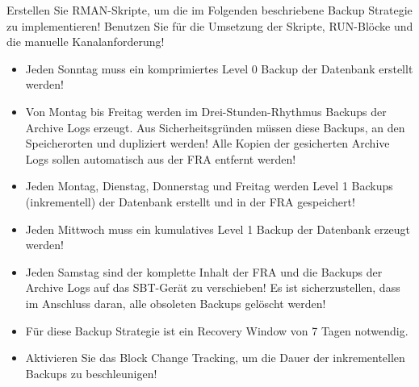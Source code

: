     \item Erstellen Sie RMAN-Skripte, um die im Folgenden beschriebene Backup Strategie zu implementieren! Benutzen Sie f\"ur die Umsetzung der Skripte, RUN-Bl\"ocke und die manuelle Kanalanforderung!
      \begin{itemize}
        \item Jeden Sonntag muss ein komprimiertes Level 0 Backup der Datenbank erstellt werden!
        \item Von Montag bis Freitag werden im Drei-Stunden-Rhythmus Backups der Archive Logs erzeugt. Aus Sicherheitsgr\"unden m\"ussen diese Backups, an den Speicherorten  und  dupliziert werden! Alle Kopien der gesicherten Archive Logs sollen automatisch aus der FRA entfernt werden!
        \item Jeden Montag, Dienstag, Donnerstag und Freitag werden Level 1 Backups (inkrementell) der Datenbank erstellt und in der FRA gespeichert!
        \item Jeden Mittwoch muss ein kumulatives Level 1 Backup der Datenbank erzeugt werden!
        \item Jeden Samstag sind der komplette Inhalt der FRA und die Backups der Archive Logs auf das SBT-Ger\"at zu verschieben! Es ist sicherzustellen, dass im Anschluss daran, alle obsoleten Backups gel\"oscht werden!
        \item F\"ur diese Backup Strategie ist ein Recovery Window von 7 Tagen notwendig.
        \item Aktivieren Sie das Block Change Tracking, um die Dauer der inkrementellen Backups zu beschleunigen!
      \end{itemize}
